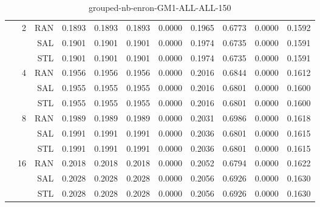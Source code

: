 \begin{center}
\begin{table}[htbp]
\begin{tabular}{ | r | r | r | r | r | r | r | r | r | r | r |}
 & \multirow{3}{*}{2} & RAN & 0.1893 & 0.1893 & 0.1893 & 0.0000 & 0.1965 & 0.6773 & 0.0000 & 0.1592\\ \cline{3-11}
 &   & SAL & 0.1901 & 0.1901 & 0.1901 & 0.0000 & 0.1974 & 0.6735 & 0.0000 & 0.1591\\ \cline{3-11}
 &   & STL & 0.1901 & 0.1901 & 0.1901 & 0.0000 & 0.1974 & 0.6735 & 0.0000 & 0.1591\\ \cline{2-11}
 & \multirow{3}{*}{4} & RAN & 0.1956 & 0.1956 & 0.1956 & 0.0000 & 0.2016 & 0.6844 & 0.0000 & 0.1612\\ \cline{3-11}
 &   & SAL & 0.1955 & 0.1955 & 0.1955 & 0.0000 & 0.2016 & 0.6801 & 0.0000 & 0.1600\\ \cline{3-11}
 &   & STL & 0.1955 & 0.1955 & 0.1955 & 0.0000 & 0.2016 & 0.6801 & 0.0000 & 0.1600\\ \cline{2-11}
 & \multirow{3}{*}{8} & RAN & 0.1989 & 0.1989 & 0.1989 & 0.0000 & 0.2031 & 0.6986 & 0.0000 & 0.1618\\ \cline{3-11}
 &   & SAL & 0.1991 & 0.1991 & 0.1991 & 0.0000 & 0.2036 & 0.6801 & 0.0000 & 0.1615\\ \cline{3-11}
 &   & STL & 0.1991 & 0.1991 & 0.1991 & 0.0000 & 0.2036 & 0.6801 & 0.0000 & 0.1615\\ \cline{2-11}
 & \multirow{3}{*}{16} & RAN & 0.2018 & 0.2018 & 0.2018 & 0.0000 & 0.2052 & 0.6794 & 0.0000 & 0.1622\\ \cline{3-11}
 &   & SAL & 0.2028 & 0.2028 & 0.2028 & 0.0000 & 0.2056 & 0.6926 & 0.0000 & 0.1630\\ \cline{3-11}
 &   & STL & 0.2028 & 0.2028 & 0.2028 & 0.0000 & 0.2056 & 0.6926 & 0.0000 & 0.1630\\ \cline{2-11}
\hline
\end{tabular}
\caption{grouped-nb-enron-GM1-ALL-ALL-150}
\end{table}
\end{center}

